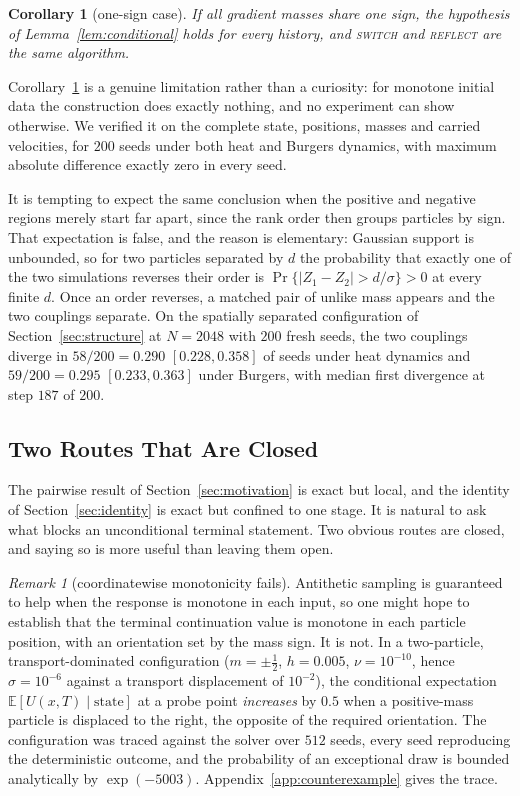 \documentclass[smallextended,nospthms]{svjour3}
\theoremstyle{plain}
\newtheorem{corollary}[proposition]{Corollary}
\theoremstyle{definition}
\theoremstyle{remark}
\newtheorem{remark}[proposition]{Remark}
\numberwithin{equation}{section}
\newcommand{\E}{\mathbb{E}}
\newcommand{\refl}{\textnormal{\textsc{reflect}}}
\newcommand{\swi}{\textnormal{\textsc{switch}}}
\begin{document}
\begin{corollary}[one-sign case]
\label{cor:onesign}
If all gradient masses share one sign, the hypothesis of
Lemma~\ref{lem:conditional} holds for every history, and \swi{} and \refl{}
are the same algorithm.
\end{corollary}

Corollary~\ref{cor:onesign} is a genuine limitation rather than a curiosity:
for monotone initial data the construction does exactly nothing, and no
experiment can show otherwise. We verified it on the complete state, positions,
masses and carried velocities, for $200$ seeds under both heat and Burgers
dynamics, with maximum absolute difference exactly zero in every seed.

It is tempting to expect the same conclusion when the positive and negative
regions merely start far apart, since the rank order then groups particles by
sign. That expectation is false, and the reason is elementary: Gaussian support
is unbounded, so for two particles separated by $d$ the probability that
exactly one of the two simulations reverses their order is
$\Pr\{|Z_1-Z_2|>d/\sigma\}>0$ at every finite $d$. Once an order reverses, a
matched pair of unlike mass appears and the two couplings separate. On the
spatially separated configuration of Section~\ref{sec:structure} at $N=2048$
with $200$ fresh seeds, the two couplings diverge in $58/200=0.290$
$[0.228,0.358]$ of seeds under heat dynamics and $59/200=0.295$ $[0.233,0.363]$
under Burgers, with median first divergence at step $187$ of $200$.

\subsection{Two Routes That Are Closed}
\label{sec:closed}

The pairwise result of Section~\ref{sec:motivation} is exact but local, and the
identity of Section~\ref{sec:identity} is exact but confined to one stage. It
is natural to ask what blocks an unconditional terminal statement. Two obvious
routes are closed, and saying so is more useful than leaving them open.

\begin{remark}[coordinatewise monotonicity fails]
\label{rem:mono}
Antithetic sampling is guaranteed to help when the response is monotone in each
input, so one might hope to establish that the terminal continuation value is
monotone in each particle position, with an orientation set by the mass sign.
It is not. In a two-particle, transport-dominated configuration
($m=\pm\tfrac12$, $h=0.005$, $\nu=10^{-10}$, hence $\sigma=10^{-6}$ against a
transport displacement of $10^{-2}$), the conditional expectation
$\E[U(x,T)\mid\text{state}]$ at a probe point \emph{increases} by $0.5$ when a
positive-mass particle is displaced to the right, the opposite of the required
orientation. The configuration was traced against the solver over $512$ seeds,
every seed reproducing the deterministic outcome, and the probability of an
exceptional draw is bounded analytically by $\exp(-5003)$.
Appendix~\ref{app:counterexample} gives the trace.
\end{remark}
\end{document}
